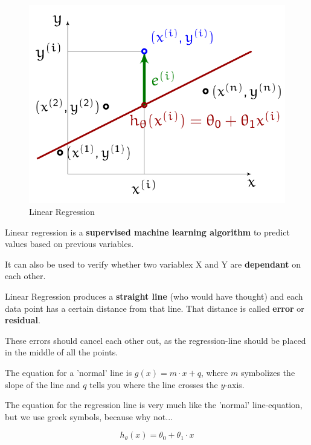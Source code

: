 \documentclass[11pt]{article}
\begin{document}
\begin{figure}
    \centering
    \includegraphics[keepaspectratio=true,height=14\baselineskip]{linear_regression.png}
    \caption{Linear Regression}
    \label{fig:linear_regression}
\end{figure}

Linear regression is a \textbf{supervised machine learning algorithm} to predict values based on previous variables.

It can also be used to verify whether two variablex X and Y are \textbf{dependant} on each other.

\vspace{10px}

Linear Regression produces a \textbf{straight line} (who would have thought) and each data point has a certain distance from that line. That distance is called \textbf{error} or \textbf{residual}.

These errors should cancel each other out, as the regression-line should be placed in the middle of all the points.

\vspace{10px}

The equation for a 'normal' line is $g(x) = m \cdot x + q$, where $m$ symbolizes the slope of the line and $q$ tells you where the line crosses the $y$-axis.

The equation for the regression line is very much like the 'normal' line-equation, but we use greek symbols, because why not...

\begin{equation}
    h_{\theta}(x) = \theta^{}_{0} + \theta^{}_{1} \cdot x
\end{equation}
\end{document}
